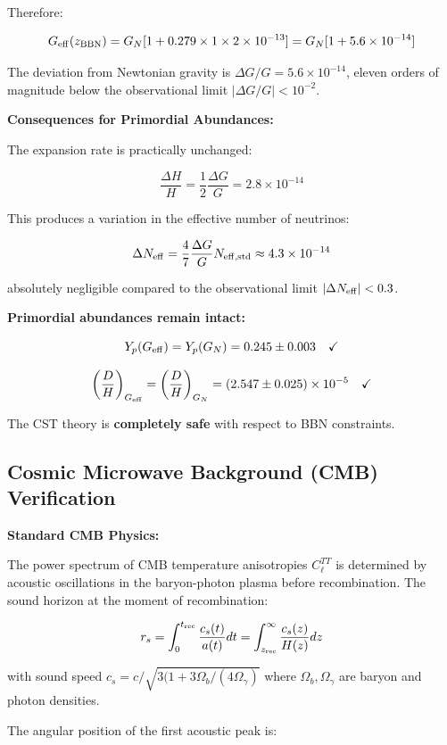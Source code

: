 \documentclass[10pt,a4paper]{article}
\begin{document}
Therefore:

\[G_{\rm eff}(z_{\rm BBN}) = G_N[1 + 0.279 \times 1 \times 2\times10^{-13}] = G_N[1 + 5.6\times10^{-14}]\]

The deviation from Newtonian gravity is
\(\Delta G/G = 5.6 \times 10^{-14}\), eleven orders of magnitude below
the observational limit \(|\Delta G/G| < 10^{-2}\).

\textbf{Consequences for Primordial Abundances:}

The expansion rate is practically unchanged:

\[\frac{\Delta H}{H} = \frac{1}{2}\frac{\Delta G}{G} = 2.8 \times 10^{-14}\]

This produces a variation in the effective number of neutrinos:

\[\Delta N_{\rm eff} = \frac{4}{7}\frac{\Delta G}{G} N_{\rm eff,std} \approx 4.3 \times 10^{-14}\]

absolutely negligible compared to the observational limit
\(|\Delta N_{\rm eff}| < 0.3\).

\textbf{Primordial abundances remain intact:}

\[Y_p(G_{\rm eff}) = Y_p(G_N) = 0.245 \pm 0.003 \quad \checkmark\]

\[\left(\frac{D}{H}\right)_{G_{\rm eff}} = \left(\frac{D}{H}\right)_{G_N} = (2.547 \pm 0.025) \times 10^{-5} \quad \checkmark\]

The CST theory is \textbf{completely safe} with respect to BBN
constraints.

\subsection{Cosmic Microwave Background (CMB)
Verification}\label{cosmic-microwave-background-cmb-verification}

\textbf{Standard CMB Physics:}

The power spectrum of CMB temperature anisotropies \(C_\ell^{TT}\) is
determined by acoustic oscillations in the baryon-photon plasma before
recombination. The sound horizon at the moment of recombination:

\[r_s = \int_0^{t_{\rm rec}} \frac{c_s(t)}{a(t)} dt = \int_{z_{\rm rec}}^\infty \frac{c_s(z)}{H(z)} dz\]

with sound speed \(c_s = c/\sqrt{3(1 + 3\Omega_b/(4\Omega_\gamma)}\)
where \(\Omega_b, \Omega_\gamma\) are baryon and photon densities.

The angular position of the first acoustic peak is:
\end{document}
